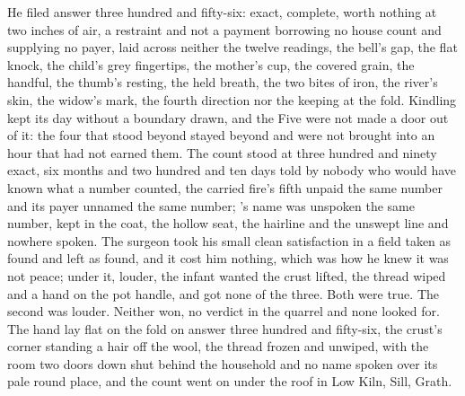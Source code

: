 He filed answer three hundred and fifty-six: exact, complete, worth nothing at two inches of air, a restraint and not a payment borrowing no house count and supplying no payer, laid across neither the twelve readings, the bell's gap, the flat knock, the child's grey fingertips, the mother's cup, the covered grain, the handful, the thumb's resting, the held breath, the two bites of iron, the river's skin, the widow's mark, the fourth direction nor the keeping at the fold. Kindling kept its day without a boundary drawn, and the Five were not made a door out of it: the four that stood beyond stayed beyond and were not brought into an hour that had not earned them. The count stood at three hundred and ninety exact, six months and two hundred and ten days told by nobody who would have known what a number counted, the carried fire's fifth unpaid the same number and its payer unnamed the same number; 's name was unspoken the same number, kept in the coat, the hollow seat, the hairline and the unswept line and nowhere spoken. The surgeon took his small clean satisfaction in a field taken as found and left as found, and it cost him nothing, which was how he knew it was not peace; under it, louder, the infant wanted the crust lifted, the thread wiped and a hand on the pot handle, and got none of the three. Both were true. The second was louder. Neither won, no verdict in the quarrel and none looked for. The hand lay flat on the fold on answer three hundred and fifty-six, the crust's corner standing a hair off the wool, the thread frozen and unwiped, with the room two doors down shut behind the household and no name spoken over its pale round place, and the count went on under the roof in Low Kiln, Sill, Grath.
